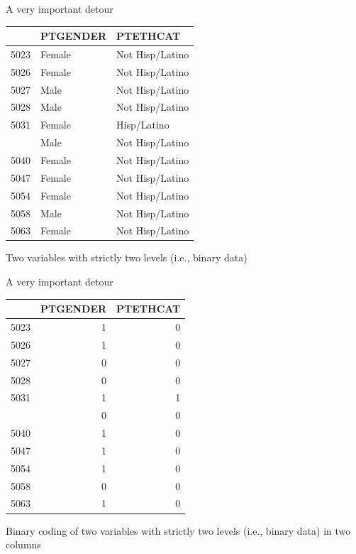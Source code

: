 \documentclass[
  ignorenonframetext,
]{beamer}
\begin{document}
\begin{frame}{A very important detour}
\protect\hypertarget{a-very-important-detour-2}{}

\begin{table}[H]
\centering\begingroup\fontsize{7}{9}\selectfont

\begin{tabular}{lll}
\toprule
  & PTGENDER & PTETHCAT\\
\midrule
5023 & Female & Not Hisp/Latino\\
5026 & Female & Not Hisp/Latino\\
5027 & Male & Not Hisp/Latino\\
5028 & Male & Not Hisp/Latino\\
5031 & Female & Hisp/Latino\\
\addlinespace
5037 & Male & Not Hisp/Latino\\
5040 & Female & Not Hisp/Latino\\
5047 & Female & Not Hisp/Latino\\
5054 & Female & Not Hisp/Latino\\
5058 & Male & Not Hisp/Latino\\
5063 & Female & Not Hisp/Latino\\
\bottomrule
\end{tabular}\endgroup{}
\end{table}

\begin{center}Two variables with strictly two levels (i.e., binary data)\end{center}

\end{frame}

\begin{frame}{A very important detour}
\protect\hypertarget{a-very-important-detour-3}{}

\begin{table}[H]
\centering\begingroup\fontsize{7}{9}\selectfont

\begin{tabular}{lrr}
\toprule
  & PTGENDER & PTETHCAT\\
\midrule
5023 & 1 & 0\\
5026 & 1 & 0\\
5027 & 0 & 0\\
5028 & 0 & 0\\
5031 & 1 & 1\\
\addlinespace
5037 & 0 & 0\\
5040 & 1 & 0\\
5047 & 1 & 0\\
5054 & 1 & 0\\
5058 & 0 & 0\\
5063 & 1 & 0\\
\bottomrule
\end{tabular}\endgroup{}
\end{table}

\begin{center}Binary coding of two variables with strictly two levels (i.e., binary data) in two columns\end{center}

\end{frame}
\end{document}
